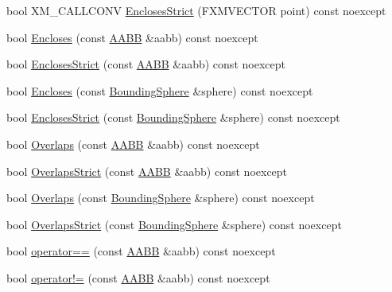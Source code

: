 \begin{DoxyCompactItemize}
\item 
bool X\+M\+\_\+\+C\+A\+L\+L\+C\+O\+NV \hyperlink{classmage_1_1_a_a_b_b_aa8946038ce497c79fa0ee34e87aa9aed}{Encloses\+Strict} (F\+X\+M\+V\+E\+C\+T\+OR point) const noexcept
\item 
bool \hyperlink{classmage_1_1_a_a_b_b_a06f017756a593461127613e4d77d0944}{Encloses} (const \hyperlink{classmage_1_1_a_a_b_b}{A\+A\+BB} \&aabb) const noexcept
\item 
bool \hyperlink{classmage_1_1_a_a_b_b_af037df0800e1e8c3564363f154c2424a}{Encloses\+Strict} (const \hyperlink{classmage_1_1_a_a_b_b}{A\+A\+BB} \&aabb) const noexcept
\item 
bool \hyperlink{classmage_1_1_a_a_b_b_ac8c2cadc06a6ad102c322504a43ca443}{Encloses} (const \hyperlink{classmage_1_1_bounding_sphere}{Bounding\+Sphere} \&sphere) const noexcept
\item 
bool \hyperlink{classmage_1_1_a_a_b_b_a463390d29cc113880fc259d1db8b1eda}{Encloses\+Strict} (const \hyperlink{classmage_1_1_bounding_sphere}{Bounding\+Sphere} \&sphere) const noexcept
\item 
bool \hyperlink{classmage_1_1_a_a_b_b_a0953268725119ef25651ab50ad3de658}{Overlaps} (const \hyperlink{classmage_1_1_a_a_b_b}{A\+A\+BB} \&aabb) const noexcept
\item 
bool \hyperlink{classmage_1_1_a_a_b_b_a00628d5ed2bf73021bbb3cdf94049580}{Overlaps\+Strict} (const \hyperlink{classmage_1_1_a_a_b_b}{A\+A\+BB} \&aabb) const noexcept
\item 
bool \hyperlink{classmage_1_1_a_a_b_b_acd344f81141b5439c3e2cf4321b6548b}{Overlaps} (const \hyperlink{classmage_1_1_bounding_sphere}{Bounding\+Sphere} \&sphere) const noexcept
\item 
bool \hyperlink{classmage_1_1_a_a_b_b_af5e8507258d4990abec9f6261449c6a9}{Overlaps\+Strict} (const \hyperlink{classmage_1_1_bounding_sphere}{Bounding\+Sphere} \&sphere) const noexcept
\item 
bool \hyperlink{classmage_1_1_a_a_b_b_a9297ff005f7bdcd934d744a6fb7ab5c9}{operator==} (const \hyperlink{classmage_1_1_a_a_b_b}{A\+A\+BB} \&aabb) const noexcept
\item 
bool \hyperlink{classmage_1_1_a_a_b_b_a1d23b60e46979cedc037fc59b3752572}{operator!=} (const \hyperlink{classmage_1_1_a_a_b_b}{A\+A\+BB} \&aabb) const noexcept
\end{DoxyCompactItemize}
